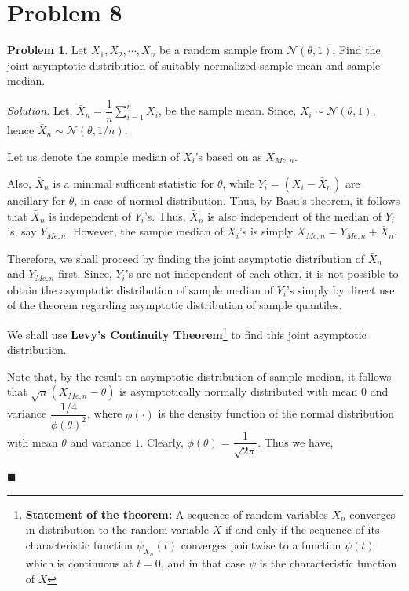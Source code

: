 \documentclass[12pt]{article}
\newcommand{\normal}{\mathcal{N}}
\theoremstyle{definition}
\newtheorem*{prb}{Problem}
\newenvironment{problem}{\begin{tcolorbox}[colback=blue!5!white,colframe=blue!75!black, parbox = true] \begin{prb}  }{\end{prb}\end{tcolorbox} }
\newenvironment{answer}{\textit{Solution: }\quad }{ \hfill $\blacksquare$}
\numberwithin{equation}{section}
\begin{document}
\pagebreak
\section{Problem 8}

\begin{problem}
Let $X_1,X_2,\cdots,X_n$ be a random sample from $\mathcal{N}(\theta,1)$. Find the joint asymptotic distribution of suitably normalized sample mean and sample median.
\end{problem}

\begin{answer}
    Let, $\bar{X}_n = \dfrac{1}{n} \sum_{i=1}^{n}X_i$, be the sample mean. Since, $X_i \sim \normal(\theta, 1)$, hence $\bar{X}_n \sim \normal(\theta, 1/n)$.

    Let us denote the sample median of $X_i$'s based on as $X_{Me, n}$.

    Also, $\bar{X}_n$ is a minimal sufficent statistic for $\theta$, while $Y_i = (X_i - \bar{X}_n)$ are ancillary for $\theta$, in case of normal distribution. Thus, by Basu's theorem, it follows that $\bar{X}_n$ is independent of $Y_i$'s. Thus, $\bar{X}_n$ is also independent of the median of $Y_i$'s, say $Y_{Me, n}$. However, the sample median of $X_i$'s is simply $X_{Me, n} = Y_{Me, n} + \bar{X}_n$.

    Therefore, we shall proceed by finding the joint asymptotic distribution of $\bar{X}_n$ and $Y_{Me, n}$ first. Since, $Y_i$'s are not independent of each other, it is not possible to obtain the asymptotic distribution of sample median of $Y_i$'s simply by direct use of the theorem regarding asymptotic distribution of sample quantiles.


    We shall use \textbf{Levy's Continuity Theorem}\footnote{\textbf{Statement of the theorem:} A sequence of random variables $X_n$ converges in distribution to the random variable $X$ if and only if the sequence of its characteristic function $\psi_{X_n}(t)$ converges pointwise to a function $\psi(t)$ which is continuous at $t = 0$, and in that case $\psi$ is the characteristic function of $X$} to find this joint asymptotic distribution. 

    Note that, by the result on asymptotic distribution of sample median, it follows that $\sqrt{n}(X_{Me, n} - \theta)$ is asymptotically normally distributed with mean $0$ and variance $\dfrac{1/4}{\phi(\theta)^2}$, where $\phi(\cdot)$ is the density function of the normal distribution with mean $\theta$ and variance $1$. Clearly, $\phi(\theta) = \dfrac{1}{\sqrt{2\pi}}$. Thus we have,
    

\end{answer}
\end{document}
